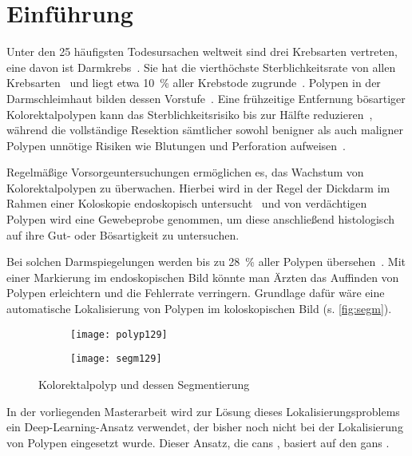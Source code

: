\chapter{Einführung}

Unter den 25 häufigsten Todesursachen weltweit sind drei Krebsarten vertreten, eine davon ist Darmkrebs~\cite{Lozano.2012}.
Sie hat die vierthöchste Sterblichkeitsrate von allen Krebsarten~\cite{Ferlay.2012} und liegt etwa 10~\% aller Krebstode zugrunde~\cite{Kumar.2005}.
Polypen in der Darmschleimhaut bilden dessen Vorstufe~\cite{Kumar.2005}.
Eine frühzeitige Entfernung bösartiger Kolorektalpolypen kann das Sterblichkeitsrisiko bis zur Hälfte reduzieren~\cite{Zauber.2012}, während die vollständige Resektion sämtlicher sowohl benigner als auch maligner Polypen unnötige Risiken wie Blutungen und Perforation aufweisen~\cite{Rex.2009}.

Regelmäßige Vorsorgeuntersuchungen ermöglichen es, das Wachstum von Kolorektalpolypen zu überwachen.
Hierbei wird in der Regel der Dickdarm im Rahmen einer Koloskopie endoskopisch untersucht~\cite{Kumar.2005} und von verdächtigen Polypen wird eine Gewebeprobe genommen, um diese anschließend histologisch auf ihre Gut- oder Bösartigkeit zu untersuchen.

Bei solchen Darmspiegelungen werden bis zu 28~\% aller Polypen übersehen~\cite{Leufkens.2012}.
Mit einer Markierung im endoskopischen Bild könnte man Ärzten das Auffinden von Polypen erleichtern und die Fehlerrate verringern.
Grundlage dafür wäre eine automatische Lokalisierung von Polypen im koloskopischen Bild (s. \autoref{fig:segm}).

\begin{figure}
	\centering
	\begin{subfigure}{.45\textwidth}
		\centering
		\texttt{[image: polyp129]}
		\caption{}
		\label{fig:polyp}
	\end{subfigure}
	\begin{subfigure}{.45\textwidth}
		\centering
		\texttt{[image: segm129]}
		\caption{}
		\label{fig:segm}
	\end{subfigure}
	\caption[Kolorektalpolyp und dessen Segmentierung]{Kolorektalpolyp und dessen Segmentierung~\cite{Vazquez.2017}}
	\label{fig:polypseg}
\end{figure}

In der vorliegenden Masterarbeit wird zur Lösung dieses Lokalisierungsproblems ein Deep-Learning-Ansatz verwendet, der bisher noch nicht bei der Lokalisierung von Polypen eingesetzt wurde.
Dieser Ansatz, die \glspl{can} \cite{Isola.2017}, basiert auf den \glspl{gan} \cite{Goodfellow.2014}.

